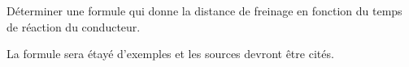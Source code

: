 
Déterminer une formule qui donne la distance de freinage en fonction du temps de réaction du conducteur.

La formule sera étayé d'exemples et les sources devront être cités.